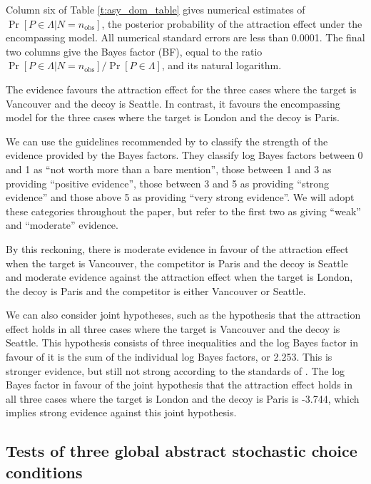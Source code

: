 \documentclass[11pt,letter]{article}
\begin{document}
Column six of Table \ref{t:asy_dom_table} gives numerical estimates of $\Pr[P \in \Lambda|N = n_{\mathrm{obs}}]$, the posterior probability of the attraction effect under the encompassing model.
All numerical standard errors are less than 0.0001.
The final two columns give the Bayes factor (BF), equal to the ratio $\Pr[P \in \Lambda|N=n_{\mathrm{obs}}]/\Pr[P \in \Lambda]$, and its natural logarithm.

The evidence favours the attraction effect for the three cases where the target is Vancouver and the decoy is Seattle.
In contrast, it favours the encompassing model for the three cases where the target is London and the decoy is Paris.

We can use the guidelines recommended by \citet{KassRaft95} to classify the strength of the evidence provided by the Bayes factors.
They classify log Bayes factors between 0 and 1 as ``not worth more than a bare mention'', those between 1 and 3 as providing ``positive evidence'', those between 3 and 5 as providing ``strong evidence'' and those above 5 as providing ``very strong evidence''.
We will adopt these categories throughout the paper, but refer to the first two as giving ``weak'' and ``moderate'' evidence.

By this reckoning, there is moderate evidence in favour of the attraction effect when the target is Vancouver, the competitor is Paris and the decoy is Seattle and moderate evidence against the attraction effect when the target is London, the decoy is Paris and the competitor is either Vancouver or Seattle.

We can also consider joint hypotheses, such as the hypothesis that the attraction effect holds in all three cases where the target is Vancouver and the decoy is Seattle.
This hypothesis consists of three inequalities and the log Bayes factor in favour of it is the sum of the individual log Bayes factors, or 2.253.
This is stronger evidence, but still not strong according to the standards of \citet{KassRaft95}.
The log Bayes factor in favour of the joint hypothesis that the attraction effect holds in all three cases where the target is London and the decoy is Paris is -3.744, which implies strong evidence against this joint hypothesis.

\subsection{Tests of three global abstract stochastic choice conditions}\label{s:global_tests}
\end{document}
